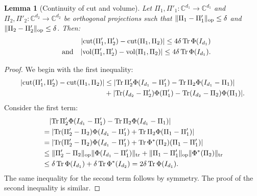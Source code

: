 \documentclass[aos]{imsart}
\newtheorem{lemma}[theorem]{Lemma}
\theoremstyle{definition}
\numberwithin{equation}{section}
\DeclareMathOperator{\op}{op}
\DeclareMathOperator{\vol}{vol}
\DeclareMathOperator{\cut}{cut}
\DeclareMathOperator{\tr}{Tr}
\DeclarePairedDelimiter{\abs}{\lvert}{\rvert}
\DeclarePairedDelimiter{\norm}{\lVert}{\rVert}
\newcommand{\C}{{\mathbb{C}}}
\begin{document}
\begin{appendix}
\begin{lemma}[Continuity of cut and volume]\label{lem:net-suffices}
Let $\Pi_1,\Pi'_1 \colon \C^{d_1}\to\C^{d_1}$ and $\Pi_2,\Pi'_2\colon\C^{d_2}\to\C^{d_2}$ be orthogonal projections such that $\norm{\Pi_1 - \Pi'_1}_{\op}\leq\delta$ and $\norm{\Pi_2 - \Pi'_2}_{\op}\leq\delta$.
Then:
\begin{align*}
  \abs{\cut(\Pi'_1,\Pi'_2) - \cut(\Pi_1,\Pi_2)} \leq 4 \delta \tr \Phi(I_{d_1}) \\
  \quad\text{and}\quad
  \abs{\vol(\Pi'_1,\Pi'_2) - \vol(\Pi_1,\Pi_2)} \leq 4 \delta \tr \Phi(I_{d_1}).
\end{align*}
\end{lemma}
\begin{proof}
We begin with the first inequality:
\begin{align*}
  \abs{\cut(\Pi'_1,\Pi'_2) - \cut(\Pi_1,\Pi_2)}
&\leq \abs{\tr \Pi'_2 \Phi(I_{d_1} - \Pi'_1) - \tr \Pi_2 \Phi(I_{d_1} - \Pi_1)} \\
&+ \abs{\tr (I_{d_2} - \Pi'_2) \Phi(\Pi'_1) - \tr (I_{d_2} - \Pi_2) \Phi(\Pi_1)}.
\end{align*}
Consider the first term:
\begin{align*}
&\quad \abs{\tr \Pi'_2 \Phi(I_{d_1} - \Pi'_1) - \tr \Pi_2 \Phi(I_{d_1} - \Pi_1)} \\
&= \abs{\tr (\Pi'_2 - \Pi_2) \Phi(I_{d_1} - \Pi'_1) + \tr \Pi_2 \Phi(\Pi_1 - \Pi'_1)} \\
&= \abs{\tr (\Pi'_2 - \Pi_2) \Phi(I_{d_1} - \Pi'_1) + \tr \Phi^*(\Pi_2) (\Pi_1 - \Pi'_1)} \\
&\leq \norm{\Pi'_2 - \Pi_2}_{\op} \norm{\Phi(I_{d_1} - \Pi'_1)}_{\operatorname{tr}} + \norm{\Pi_1 - \Pi'_1}_{\op} \norm{\Phi^*(\Pi_2)}_{\operatorname{tr}} \\
&\leq \delta \tr \Phi(I_{d_1}) + \delta \tr \Phi^*(I_{d_2})
= 2 \delta \tr \Phi(I_{d_1}).
\end{align*}
The same inequality for the second term follows by symmetry.
The proof of the second inequality is similar.
\end{proof}


\end{appendix}
\end{document}
